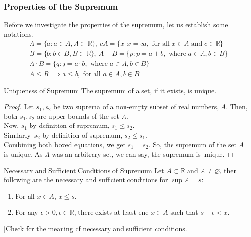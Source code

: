 \subsubsection{Properties of the Supremum}
Before we investigate the properties of the supremum, let us establish some notations.
\begin{align*}
    & A=\{a:a\in A, A\subset\mathbb{R}\},\ cA=\{x:x=ca,\text{ for all }x\in A\text{ and }c\in\mathbb{R} \}\\
    & B=\{b:b\in B, B\subset\mathbb{R}\},\ A+B=\{p:p=a+b,\text{ where }a\in A,b\in B\}\\
    & A\cdot B=\{q:q=a\cdot b,\text{ where }a\in A,b\in B\}\\
    & A\leq B\implies a\leq b,\text{ for all }a\in A, b\in B
\end{align*}
\begin{Theorem}{Uniqueness of Supremum}\label{uniqueness_supremum}
    The supremum of a set, if it exists, is unique.
\end{Theorem}
\begin{proof}
    Let $s_1, s_2$ be two suprema of a non-empty subset of real numbers, $A$. Then, both $s_1, s_2$ are upper bounds of the set $A$.\\ 
    Now, $s_1$ by definition of supremum, $\boxed{s_1\leq s_2}$.\\
    Similarly, $s_2$ by definition of supremum, $\boxed{s_2\leq s_1}$. \\
    Combining both boxed equations, we get $s_1=s_2$. So, the supremum of the set $A$ is unique. As $A$ was an arbitrary set, we can say, the supremum is unique.
\end{proof}
\begin{Theorem}{Necessary and Sufficient Conditions of Supremum}\label{iff_supremum}
    Let $A\subset\mathbb{R}$ and $A\neq\varnothing$, then following are the necessary and sufficient conditions for $\sup A=s$:
    \begin{enumerate}
        \item For all $x\in A$, $x\leq s$.
        \item For any $\epsilon>0, \epsilon\in\mathbb{R}$, there exists at least one $x\in A$ such that $s-\epsilon<x$.\footnotemark
    \end{enumerate}
    [Check  for the meaning of necessary and sufficient conditions.]
\end{Theorem}

